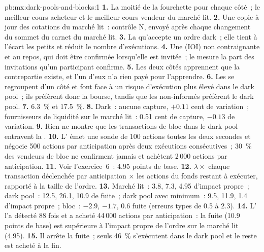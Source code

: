 \begin{solution}{pb:mx:dark-pools-and-blocks:1}
\textbf{1.} La moitié de la fourchette pour chaque côté~; le meilleur cours acheteur et le meilleur cours vendeur du marché lit.
\textbf{2.} Une copie à jour des cotations du marché lit~: contrôle N, envoyé après chaque changement du sommet du carnet du marché lit.
\textbf{3.} La  qu'accepte un ordre dark~; elle tient à l'écart les petits  et réduit le nombre d'exécutions.
\textbf{4.} Une  (IOI) non contraignante et au repos, qui doit être confirmée lorsqu'elle est invitée~; le  mesure la part des invitations qu'un participant confirme.
\textbf{5.} Les deux côtés apprennent que la contrepartie existe, et l'un d'eux n'a rien payé pour l'apprendre.
\textbf{6.} Les  se regroupent d'un côté et font face à un risque d'exécution plus élevé dans le dark pool~; ils préfèrent donc la bourse, tandis que les non-informés préfèrent le dark pool.
\textbf{7.} 6.3~\% et 17.5~\%.
\textbf{8.} Dark~: aucune capture, $+0.11$ cent de variation~; fournisseurs de liquidité sur le marché lit~: 0.51 cent de capture, $-0.13$ de variation.
\textbf{9.} Rien ne montre que les transactions de bloc dans le dark pool entravent la .
\textbf{10.} L' émet une sonde de 100 actions toutes les deux secondes et négocie 500 actions par anticipation après deux exécutions consécutives~; 30~\% des vendeurs de bloc ne confirment jamais et achètent
2\,000 actions par anticipation.
\textbf{11.} Voir l'exercice~6~: 4.95 points de base.
\textbf{12.} $\lambda\times$ chaque transaction déclenchée par anticipation $\times$ les actions du fonds restant à exécuter, rapporté à la taille de l'ordre.
\textbf{13.} Marché lit~: 3.8, 7.3, 4.95 d'impact propre~; dark pool~: 12.5, 26.1, 10.9 de fuite~; dark pool avec minimum~: 9.5, 11.9, 1.4 d'impact propre~; bloc~: $-2.9$, $-1.7$, 0.6
fuite (erreurs types de 0.5 à 2.3).
\textbf{14.} L' l'a détecté 88 fois et a acheté 44\,000 actions par anticipation~: la fuite (10.9 points de base) est supérieure à l'impact propre de l'ordre sur le marché lit (4.95).
\textbf{15.} Il arrête la fuite~; seuls 46~\% s'exécutent dans le dark pool et le reste est acheté à la fin.

\end{solution}
